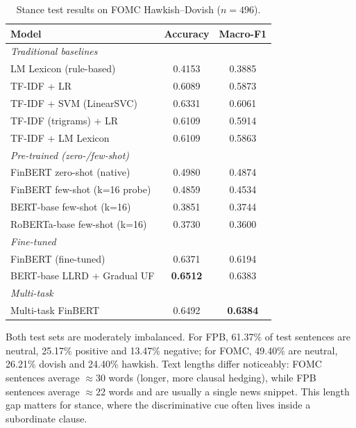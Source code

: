\documentclass[conference, 10pt, twocolumn]{IEEEtran}
\begin{document}
\begin{table}[h]
\centering
\caption{Stance test results on FOMC Hawkish--Dovish ($n=496$).}
\label{tab:stance}
\small
\begin{tabular}{lcc}
\toprule
\textbf{Model} & \textbf{Accuracy} & \textbf{Macro-F1} \\
\midrule
\multicolumn{3}{l}{\emph{Traditional baselines}} \\
LM Lexicon (rule-based)         & 0.4153 & 0.3885 \\
TF-IDF + LR                     & 0.6089 & 0.5873 \\
TF-IDF + SVM (LinearSVC)        & 0.6331 & 0.6061 \\
TF-IDF (trigrams) + LR          & 0.6109 & 0.5914 \\
TF-IDF + LM Lexicon             & 0.6109 & 0.5863 \\
\midrule
\multicolumn{3}{l}{\emph{Pre-trained (zero-/few-shot)}} \\
FinBERT zero-shot (native)      & 0.4980 & 0.4874 \\
FinBERT few-shot (k=16 probe)   & 0.4859 & 0.4534 \\
BERT-base few-shot (k=16)       & 0.3851 & 0.3744 \\
RoBERTa-base few-shot (k=16)    & 0.3730 & 0.3600 \\
\midrule
\multicolumn{3}{l}{\emph{Fine-tuned}} \\
FinBERT (fine-tuned)            & 0.6371 & 0.6194 \\
BERT-base LLRD + Gradual UF     & \textbf{0.6512} & 0.6383 \\
\midrule
\multicolumn{3}{l}{\emph{Multi-task}} \\
Multi-task FinBERT              & 0.6492 & \textbf{0.6384} \\
\bottomrule
\end{tabular}
\end{table}


Both test sets are moderately imbalanced. For FPB, 61.37\% of test
sentences are neutral, 25.17\% positive and 13.47\% negative; for FOMC,
49.40\% are neutral, 26.21\% dovish and 24.40\% hawkish. Text lengths
differ noticeably: FOMC sentences average $\approx$30 words (longer, more
clausal hedging), while FPB sentences average $\approx$22 words and are
usually a single news snippet. This length gap matters for stance, where
the discriminative cue often lives inside a subordinate clause.
\end{document}

